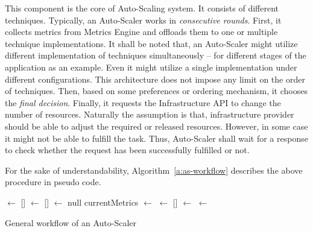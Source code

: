 \begin{description}[leftmargin=0pt]
    \item[Auto-Scaler] This component is the core of Auto-Scaling system. It consists of different techniques. Typically, an Auto-Scaler works in \emph{consecutive rounds}. First, it collects metrics from Metrics Engine and offloads them to one or multiple technique implementations. It shall be noted that, an Auto-Scaler might utilize different implementation of techniques simultaneously -- for different stages of the application as an example. Even it might utilize a single implementation under different configurations. This architecture does not impose any limit on the order of techniques. Then, based on some preferences or ordering mechanism, it chooses the \emph{final decision}. Finally, it requests the Infrastructure API to change the number of resources. Naturally the assumption is that, infrastructure provider should be able to adjust the required or released resources. However, in some case it might not be able to fulfill the task. Thus, Auto-Scaler shall wait for a response to check whether the request has been successfully fulfilled or not. 
\end{description}
For the sake of understandability, Algorithm~\ref{a:as-workflow} describes the above procedure in pseudo code.
\begin{algorithm}[h]
    \DontPrintSemicolon
    
    
    
    \impls $\gets$ [] \;
    \dec $\gets$ [] \;
    \finaldec $\gets$ null\;
    \;
    \;
     {
        currentMetrics $\gets$ \GCMFME{} \;
        \;
        \dec $\gets$ [] \;
        \;
        \finaldec $\gets$ \GFD{\dec} \;
        \;
        \reply $\gets$ \RIA{\finaldec}\;
        \;
    }
    \caption{General workflow of an Auto-Scaler}
    \label{a:as-workflow}
\end{algorithm}
 
